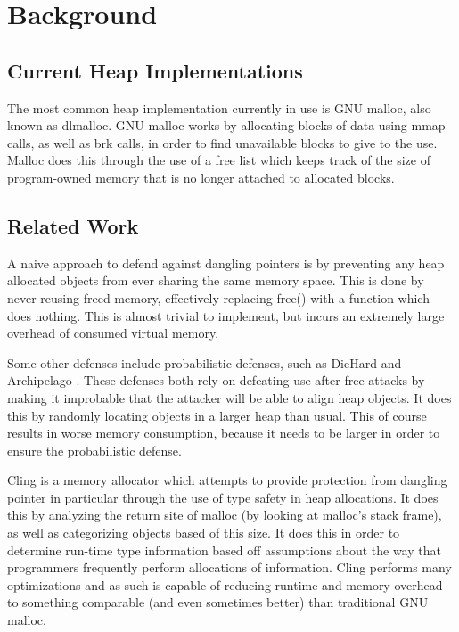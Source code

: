 \documentclass[conference]{IEEEtran}
\begin{document}
\section{Background}

\subsection{Current Heap Implementations}
The most common heap implementation currently in use is GNU malloc, also 
known as dlmalloc. GNU malloc works by allocating blocks of data using mmap 
calls, as well as brk calls, in order to find unavailable blocks to give to 
the use. Malloc does this through the use of a free list which keeps track 
of the size of program-owned memory that is no longer attached to allocated 
blocks.

\subsection{Related Work}
A naive approach to defend against dangling pointers is by preventing any 
heap allocated objects from ever sharing the same memory space. This is done 
by never reusing freed memory, effectively replacing free() with a function 
which does nothing. This is almost trivial to implement, but incurs an 
extremely large overhead of consumed virtual memory.

Some other defenses include probabilistic defenses, such as DieHard \cite{b2}
and Archipelago \cite{b3}. These defenses both rely on defeating 
use-after-free attacks by making it improbable that the attacker will be able 
to align heap objects. It does this by randomly locating objects in a larger 
heap than usual. This of course results in worse memory consumption, because 
it needs to be larger in order to ensure the probabilistic defense.

Cling \cite{b1} is a memory allocator which attempts to provide protection 
from dangling pointer in particular through the use of type safety in heap 
allocations. It does this by analyzing the return site of malloc (by looking 
at malloc’s stack frame), as well as categorizing objects based of this size. 
It does this in order to determine run-time type information based off 
assumptions about the way that programmers frequently perform allocations of 
information. Cling performs many optimizations and as such is capable of 
reducing runtime and memory overhead to something comparable (and even 
sometimes better) than traditional GNU malloc. 
\end{document}
